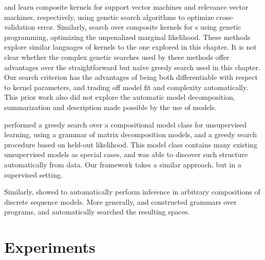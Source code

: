 \citet{diosan2007evolving} and \citet{bing2010gp} learn composite kernels for support vector machines and relevance vector machines, respectively, using genetic search algorithms to optimize cross-validation error.
Similarly, \citet{kronberger2013evolution} search over composite kernels for \gp{}s using genetic programming, optimizing the unpenalized marginal likelihood.
These methods explore similar languages of kernels to the one explored in this chapter.
It is not clear whether the complex genetic searches used by these methods offer advantages over the straightforward but na\"{i}ve greedy search used in this chapter.
Our search criterion has the advantages of being both differentiable with respect to kernel parameters, and trading off model fit and complexity automatically.
This prior work also did not explore the automatic model decomposition, summarization and description made possible by the use of \gp{} models.


\citet{grosse2012exploiting} performed a greedy search over a compositional model class for unsupervised learning, using a grammar of matrix decomposition models, and a greedy search procedure based on held-out likelihood.
This model class contains many existing unsupervised models as special cases, and was able to discover such structure automatically from data.
Our framework takes a similar approach, but in a supervised setting.

Similarly, \citet{christian-thesis} showed to automatically perform inference in arbitrary compositions of discrete sequence models.
More generally, \citet{dechter2013bootstrap} and \citet{liang2010learning} constructed grammars over programs, and automatically searched the resulting spaces.




\section{Experiments}
\label{sec:numerical}

